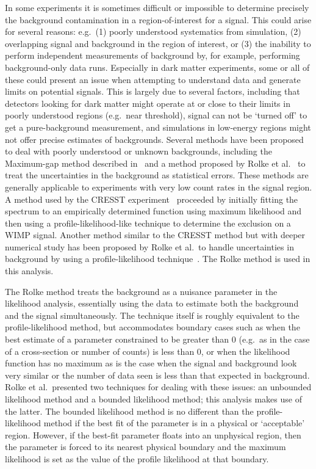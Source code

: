 In some experiments it is sometimes difficult or impossible to determine precisely the background contamination in a region-of-interest for a signal.  This could arise for several reasons: e.g.~(1) poorly understood systematics from simulation, (2) overlapping signal and background in the region of interest, or (3) the inability to perform independent measurements of background by, for example, performing background-only data runs.  Especially in dark matter experiments, some or all of these could present an issue when attempting to understand data and generate limits on potential signals.  This is largely due to several factors, including that detectors looking for dark matter might operate at or close to their limits in poorly understood regions (e.g.~near threshold), signal can not be `turned off' to get a pure-background measurement, and simulations in low-energy regions might not offer precise estimates of backgrounds.  Several methods have been proposed to deal with poorly understood or unknown backgrounds, including the Maximum-gap method described in~\cite{Yell02} and a method proposed by Rolke et al.~\cite{Rolke2001} to treat the uncertainties in the background as statistical errors.  These methods are generally applicable to experiments with very low count rates in the signal region.  A method used by the CRESST experiment~\cite{Anglo2002} proceeded by initially fitting the spectrum to an empirically determined function using maximum likelihood and then using a profile-likelihood-like technique to determine the exclusion on a WIMP signal.  Another method similar to the CRESST method but with deeper numerical study has been proposed by Rolke et al.~to handle uncertainties in background by using a profile-likelihood technique~\cite{Rol05}.  The Rolke method is used in this analysis.  

The Rolke method treats the background as a nuisance parameter in the likelihood analysis, essentially using the data to estimate both the background and the signal simultaneously.  The technique itself is roughly equivalent to the profile-likelihood method, but accommodates boundary cases such as when the best estimate of a parameter constrained to be greater than 0 (e.g.~as in the case of a cross-section or number of counts) is less than 0, or when the likelihood function has no maximum as is the case when the signal and background look very similar or the number of data seen is less than that expected in background.  Rolke et al.~presented two techniques for dealing with these issues: an unbounded likelihood method and a bounded likelihood method; this analysis makes use of the latter.  The bounded likelihood method is no different than the profile-likelihood method if the best fit of the parameter is in a physical or `acceptable' region.  However, if the best-fit parameter floats into an unphysical region, then the parameter is forced to its nearest physical boundary and the maximum likelihood is set as the value of the profile likelihood at that boundary.  

